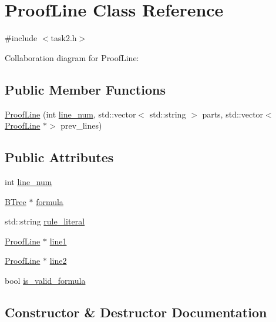\hypertarget{classProofLine}{}\section{Proof\+Line Class Reference}
\label{classProofLine}


{\ttfamily \#include $<$task2.\+h$>$}



Collaboration diagram for Proof\+Line\+:
\subsection*{Public Member Functions}
\begin{DoxyCompactItemize}
\item 
\hyperlink{classProofLine_a917582971a502aa8fc114467185c08b8}{Proof\+Line} (int \hyperlink{classProofLine_af1e2b73ad5275235028a4b131e574aa7}{line\+\_\+num}, std\+::vector$<$ std\+::string $>$ parts, std\+::vector$<$ \hyperlink{classProofLine}{Proof\+Line} $\ast$$>$ prev\+\_\+lines)
\end{DoxyCompactItemize}
\subsection*{Public Attributes}
\begin{DoxyCompactItemize}
\item 
int \hyperlink{classProofLine_af1e2b73ad5275235028a4b131e574aa7}{line\+\_\+num}
\item 
\hyperlink{classBTree}{B\+Tree} $\ast$ \hyperlink{classProofLine_ac9dee0241ef4f6371135098fd5b1a66d}{formula}
\item 
std\+::string \hyperlink{classProofLine_acdc39e9e092a10ba3a6124f21c0eb420}{rule\+\_\+literal}
\item 
\hyperlink{classProofLine}{Proof\+Line} $\ast$ \hyperlink{classProofLine_a7dbdcf0ea65aed377c5ac03303b474a6}{line1}
\item 
\hyperlink{classProofLine}{Proof\+Line} $\ast$ \hyperlink{classProofLine_afed6bbbe21b20cdbde9398eb73ccf15f}{line2}
\item 
bool \hyperlink{classProofLine_a8531e674967263c2e6ba67d8bf12a336}{is\+\_\+valid\+\_\+formula}
\end{DoxyCompactItemize}


\subsection{Constructor \& Destructor Documentation}
\mbox{\label{classProofLine_a917582971a502aa8fc114467185c08b8}} 
